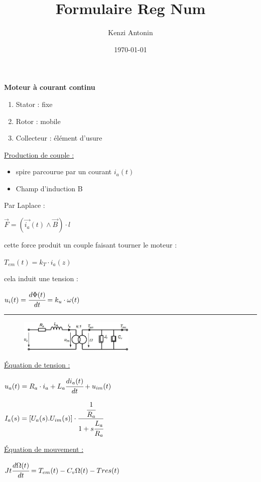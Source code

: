 \documentclass[	DIV=calc,%
							paper=a4,%
							fontsize=10pt,%
							twocolumn]{scrartcl} %
\title{Formulaire Reg Num} %
\author{Kenzi Antonin}	%
\date{\vspace{-30pt} \today} %
\newcommand{\hformbar}[1]{\bigskip\hrule\vspace{5pt}} %
\newcommand{\initial}[1]{%
     \lettrine[lines=3,lhang=0.3,nindent=0em]{
     				\color{DarkGoldenrod}
     				{\textsf{#1}}}{}}
\newcounter{mycounter}
\newcommand{\formdesc}[1]{\noindent\textbf{#1} \addtocounter{mycounter}{1} \hfill \themycounter}
\newcommand{\formtitle}[1]{\noindent\underline{#1}}
\begin{document}
{\maketitle }
\thispagestyle{fancy} 	%

\formdesc{Moteur à courant continu}
\begin{enumerate}
    \item Stator : fixe
    \item Rotor : mobile
    \item Collecteur : élément d'usure 
\end{enumerate}

\formtitle{Production de couple :}
\begin{itemize}
    \item spire parcourue par un courant $i_a(t)$
    \item Champ d'induction B 
\end{itemize}
Par Laplace :

{\hfill $\vec{F} = (\vec{i_a}(t) \wedge  \vec{B})\cdot l$\hfill}

cette force produit un couple faisant tourner le moteur : 

{\hfill $T_{em}(t) = k_T \cdot i_a(z)$\hfill}

cela induit une tension :

{\hfill $u_i(t) = \cfrac{d \Phi(t)}{dt}=k_u \cdot \omega(t)$\hfill}

\hformbar

\formdesc{Équations du moteur Dc et de la charge}
{ \vspace{-3mm}
    \begin{figure}[H]
        \includegraphics[width=0.49\textwidth]{img/equation_mot.JPG}
    \end{figure}
}
\formtitle{Équation de tension : }

{\hfill $u_a(t) = R_a \cdot i_a + L_a \cfrac{di_a(t)}{dt}+u_{im}(t)$\hfill}

{\hfill $I_a(s) = [U_a(s).U_{im}(s)] \cdot \cfrac{ \cfrac{1}{R_a}}{1+s\cfrac{L_a}{R_a}}  $\hfill}


\formtitle{Équation de mouvement :} 

{\hfill $Jt \cfrac{d\Omega(t)}{dt} = T_{em}(t) - C_v \Omega(t) - Tres(t) $\hfill}
\end{document}
